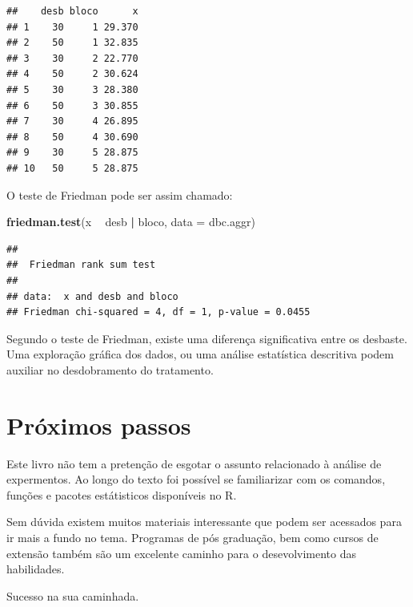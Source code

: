 \documentclass[
]{article}
\newenvironment{Shaded}{\begin{snugshade}}{\end{snugshade}}
\newcommand{\DataTypeTok}[1]{\textcolor[rgb]{0.13,0.29,0.53}{#1}}
\newcommand{\KeywordTok}[1]{\textcolor[rgb]{0.13,0.29,0.53}{\textbf{#1}}}
\newcommand{\NormalTok}[1]{#1}
\newcommand{\OperatorTok}[1]{\textcolor[rgb]{0.81,0.36,0.00}{\textbf{#1}}}
\newcommand{\StringTok}[1]{\textcolor[rgb]{0.31,0.60,0.02}{#1}}
\begin{document}
\begin{verbatim}
##    desb bloco      x
## 1    30     1 29.370
## 2    50     1 32.835
## 3    30     2 22.770
## 4    50     2 30.624
## 5    30     3 28.380
## 6    50     3 30.855
## 7    30     4 26.895
## 8    50     4 30.690
## 9    30     5 28.875
## 10   50     5 28.875
\end{verbatim}

O teste de Friedman pode ser assim chamado:

\begin{Shaded}
\begin{Highlighting}[]
\KeywordTok{friedman.test}\NormalTok{(x }\OperatorTok{~}\StringTok{ }\NormalTok{desb }\OperatorTok{|}\StringTok{ }\NormalTok{bloco, }\DataTypeTok{data =}\NormalTok{ dbc.aggr)}
\end{Highlighting}
\end{Shaded}

\begin{verbatim}
## 
##  Friedman rank sum test
## 
## data:  x and desb and bloco
## Friedman chi-squared = 4, df = 1, p-value = 0.0455
\end{verbatim}

Segundo o teste de Friedman, existe uma diferença significativa entre os desbaste. Uma exploração gráfica dos dados, ou uma análise estatística descritiva podem auxiliar no desdobramento do tratamento.

\hypertarget{pruxf3ximos-passos}{%
\section{Próximos passos}\label{pruxf3ximos-passos}}

Este livro não tem a pretenção de esgotar o assunto relacionado à análise de expermentos. Ao longo do texto foi possível se familiarizar com os comandos, funções e pacotes estátisticos disponíveis no R.

Sem dúvida existem muitos materiais interessante que podem ser acessados para ir mais a fundo no tema. Programas de pós graduação, bem como cursos de extensão também são um excelente caminho para o desevolvimento das habilidades.

Sucesso na sua caminhada.
\end{document}
